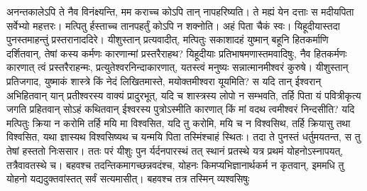 \vakya अनन्तकालेऽपि ते नैव विनंक्ष्यन्ति, मम कराच्च कोऽपि तान् नापहरिष्यति।
\vakya ते मह्यं येन दत्ताः स मदीयपिता सर्वेभ्यो महत्तरः। मत्पितु र्हस्ताच्च तानपहर्तुं कोऽपि न शक्नोति।
\vakya अहं पिता चैकं स्वः।
\vakya यिहूदीयास्तदा पुनस्तमाहन्तुं प्रस्तरानाददिरे।
\vakya यीशुस्तान् प्रत्यवादीत्, मत्पितुः सकाशादहं युष्मान् बहूनि हितकर्माणि दर्शितवान्, तेषां कस्य कर्मणः कारणान्मां प्रस्तरैराहथ?
\vakya यिहूदीयाः प्रतिभाषमणास्तमवादिषुः, नैव हितकर्मणः कारणात् त्वं प्रस्तरैराहन्मः, प्रत्युतेश्वरनिन्दाकारणात्, यतस्त्वं मनुष्यः सन्नात्मानमीश्वरं कुरुषे।
\vakya यीशुस्तान् प्रतिजगाद, युष्माकं शास्त्रे किं नेदं लिखितमास्ते, मयोक्तमीश्वरा यूयमिति?
\vakya स यदि तान् ईश्वरान् अभिहितवान् यान् प्रतीश्वरस्य वाक्यं प्रादुरभूत्, यदि च शास्त्रस्य लोपो न सम्भवति,
\vakya तर्हि पिता यं पवित्रीकृत्य जगति प्रहितवान् सोऽहं कथितवान् ईश्वरस्य पुत्रोऽस्मीति कारणात् किं मां वदथ त्वमीश्वरं निन्दसीति?
\vakya यदि मत्पितुः क्रिया न करोमि तर्हि मयि मा विश्वसित,
\vakya यदि तु करोमि, मयि च न विश्वसिथ, तर्हि क्रियासु तथा विश्वसित, यथा ज्ञास्यथ विश्वसिष्यथ च यन्मयि पिता तस्मिंश्चाहं स्थितः।
\vakya तदा ते पुनस्तं धर्तुमयतन्त, स तु तेषां हस्ततो निःससार।
\vakya ततः परं यीशुः पुन र्यर्दनपारस्थं तत् स्थानं प्रतस्थे यत्र प्रथमं योहनोऽस्नापयत्, तत्रैवावतस्थे च।
\vakya बहवश्च तदन्तिकमागच्छन्नवदंश्च, योहनः किमप्यभिज्ञानार्थकर्म न कृतवान्, इममधि तु योहनो यद्यदुक्तवांस्तत् सर्वं सत्यमासीत्।
\vakya बहवश्च तत्र तस्मिन् व्यश्वसिषुः\eoc
